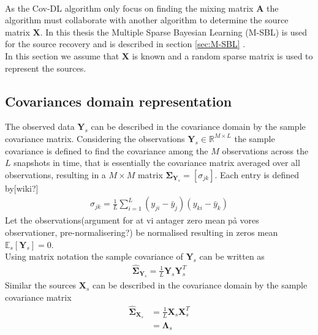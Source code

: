 \\
As the Cov-DL algorithm only focus on finding the mixing matrix $\mathbf{A}$ the algorithm must collaborate with another algorithm to determine the source matrix $\mathbf{X}$. In this thesis the Multiple Sparse Bayesian Learning (M-SBL) is used for the source recovery and is described in section \ref{sec:M-SBL} . 
\\
In this section we assume that $\mathbf{X}$ is known and a random sparse matrix is used to represent the sources. 


\subsection{Covariances domain representation}
The observed data $\mathbf{Y}_s$ can be described in the covariance domain by the sample covariance matrix. Considering the observations $\mathbf{Y}_s \in \mathbb{R}^{M\times L}$ the sample covariance is defined to find the covariance among the $M$ observations across the $L$ snapshots in time, that is essentially the covariance matrix averaged over all observations, resulting in a $M \times M$ matrix $\boldsymbol{\Sigma}_{\mathbf{Y}_s}=[\sigma_{jk}]$. Each entry is defined by[wiki?] 
\begin{align*}
\sigma_{jk}= \frac{1}{L}\sum_{i=1}^{L}(y_{ji}- \bar{y}_j)(y_{ki}-\bar{y}_k)
\end{align*}
Let the observations(argument for at vi antager zero mean på vores observationer, pre-normalisering?) be normalised resulting in zeros mean $\mathbb{E}_s[\mathbf{Y}_s]=0$. \\
Using matrix notation the sample covariance of $\mathbf{Y}_s$ can be written as
\begin{align*}
\hat{\boldsymbol{\Sigma}}_{\mathbf{Y}_s} = \frac{1}{L} \mathbf{Y}_s \mathbf{Y}_s^T
\end{align*}  
Similar the sources $\mathbf{X}_s$ can be described in the covariance domain by the sample covariance matrix
\begin{align*}
\hat{\boldsymbol{\Sigma}}_{\mathbf{X}_s} &= \frac{1}{L} \mathbf{X}_s \mathbf{X}_s^T \\
&= \boldsymbol{\Lambda}_s
\end{align*}
